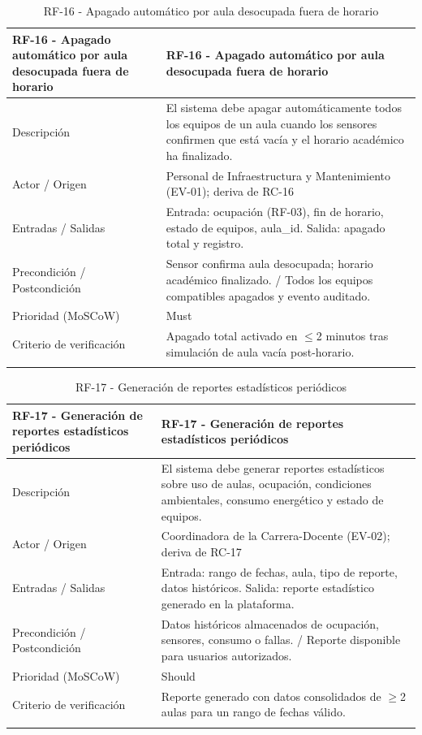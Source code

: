 \begingroup
\small
\begin{longtable}{|p{7.8cm}|p{7.8cm}|}
\hline
RF-16 - Apagado automático por aula desocupada fuera de horario & RF-16 - Apagado automático por aula desocupada fuera de horario \\ \hline
Descripción & El sistema debe apagar automáticamente todos los equipos de un aula cuando los sensores confirmen que está vacía y el horario académico ha finalizado. \\ \hline
Actor / Origen & Personal de Infraestructura y Mantenimiento (EV-01); deriva de RC-16 \\ \hline
Entradas / Salidas & Entrada: ocupación (RF-03), fin de horario, estado de equipos, aula\_id. Salida: apagado total y registro. \\ \hline
Precondición / Postcondición & Sensor confirma aula desocupada; horario académico finalizado. / Todos los equipos compatibles apagados y evento auditado. \\ \hline
Prioridad (MoSCoW) & Must \\ \hline
Criterio de verificación & Apagado total activado en $\leq$2 minutos tras simulación de aula vacía post-horario. \\ \hline
\caption{RF-16 - Apagado automático por aula desocupada fuera de horario}
\end{longtable}
\endgroup

\begingroup
\small
\begin{longtable}{|p{7.8cm}|p{7.8cm}|}
\hline
RF-17 - Generación de reportes estadísticos periódicos & RF-17 - Generación de reportes estadísticos periódicos \\ \hline
Descripción & El sistema debe generar reportes estadísticos sobre uso de aulas, ocupación, condiciones ambientales, consumo energético y estado de equipos. \\ \hline
Actor / Origen & Coordinadora de la Carrera-Docente (EV-02); deriva de RC-17 \\ \hline
Entradas / Salidas & Entrada: rango de fechas, aula, tipo de reporte, datos históricos. Salida: reporte estadístico generado en la plataforma. \\ \hline
Precondición / Postcondición & Datos históricos almacenados de ocupación, sensores, consumo o fallas. / Reporte disponible para usuarios autorizados. \\ \hline
Prioridad (MoSCoW) & Should \\ \hline
Criterio de verificación & Reporte generado con datos consolidados de $\geq$2 aulas para un rango de fechas válido. \\ \hline
\caption{RF-17 - Generación de reportes estadísticos periódicos}
\end{longtable}
\endgroup

